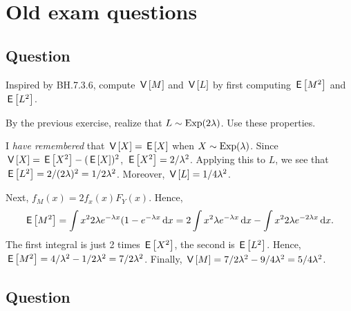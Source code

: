 



\chapter{Old  exam questions}


\section*{Question}
\label{sec:question-1}

\begin{exercise}
Inspired by BH.7.3.6, compute $\,\mathsf{V}\left[M\right]$ and $\,\mathsf{V}\left[L\right]$ by first computing $\,\mathsf{E}\left[M^{2}\right]$ and $\,\mathsf{E}\left[L^{2}\right]$.
\begin{hint}
By the previous exercise, realize that $L\sim\mathrm{Exp}(2\lambda)$.  Use these properties.
\end{hint}
\begin{solution}
I \emph{have remembered} that $\,\mathsf{V}\left[X\right] = \,\mathsf{E}\left[X\right]$ when $X\sim \mathrm{Exp}(\lambda)$. Since $\,\mathsf{V}\left[X\right] = \,\mathsf{E}\left[X^{2}\right] - (\,\mathsf{E}\left[X\right])^{2}$, $\,\mathsf{E}\left[X^2\right]=2/\lambda^{2}$. Applying this to $L$, we see that $\,\mathsf{E}\left[L^2\right] = 2/(2\lambda)^{2} = 1/2\lambda^{2}$. Moreover, $\,\mathsf{V}\left[L\right] = 1/4\lambda^{2}$.

Next, $f_M(x) = 2 f_x(x) F_Y(x)$. Hence,
\begin{equation*}
\,\mathsf{E}\left[M^2\right] = \int x^2 2 \lambda e^{-\lambda x} (1-e^{-\lambda x}\,\textrm{d}x = 2 \int x^2  \lambda e^{-\lambda x} \,\textrm{d}x - \int x^{2} 2 \lambda e^{-2\lambda x}\,\textrm{d}x.
\end{equation*}
The first integral is just 2 times $\,\mathsf{E}\left[X^{2}\right]$, the second is $\,\mathsf{E}\left[L^2\right]$. Hence, $\,\mathsf{E}\left[M^2\right]=4/\lambda^2-1/2\lambda^2= 7/2\lambda^{2}$. Finally, $\,\mathsf{V}\left[M\right] = 7/2\lambda^2 - 9/4\lambda^2= 5/4\lambda^{2}$.
\end{solution}
\end{exercise}



\section*{Question}
\label{sec:question-2}

